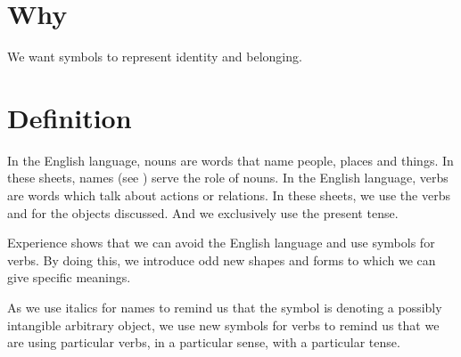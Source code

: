 

\section*{Why}

We want symbols to represent identity and belonging.


\section*{Definition}

In the English language, nouns are words that name people, places and things.
In these sheets, names (see ) serve the role of nouns.
In the English language, verbs are words which talk about actions or relations.
In these sheets, we use the verbs  and  for the objects discussed.
And we exclusively use the present tense.


Experience shows that we can avoid the English language and use symbols for verbs.
By doing this, we introduce odd new shapes and forms to which we can give specific meanings.
%  

As we use italics for names to remind us that the symbol is denoting a possibly intangible arbitrary object, we use new symbols for verbs to remind us that we are using particular verbs, in a particular sense, with a particular tense.
%  

